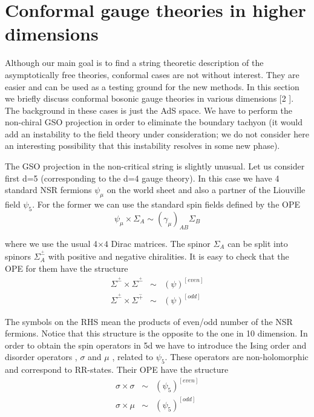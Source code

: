 \documentclass[a4paper,12pt]{article}
\begin{document}
\section{Conformal gauge theories in higher dimensions}

Although our main goal is to find a string theoretic description of the
asymptotically free theories, conformal cases are not without interest. They
are easier and can be used as a testing ground for the new methods. In this
section we briefly discuss conformal bosonic gauge theories in various
dimensions [2 ]. The background in these cases is just the AdS space. We
have to perform the non-chiral GSO projection in order to eliminate the
boundary tachyon (it would add an instability to the field theory under
consideration; we do not consider here an interesting possibility that this
instability resolves in some new phase).

The GSO projection in the non-critical string is slightly unusual. Let us
consider first d=5 (corresponding to the d=4 gauge theory). In this case we
have 4 standard NSR fermions $\psi _{\mu }$ on the world sheet and also a
partner of the Liouville field $\psi _{5}$. For the former we can use the
standard spin fields defined by the OPE 
\begin{equation}
\psi _{\mu }\times \Sigma _{A}\sim \left( \gamma _{\mu }\right) _{AB}\Sigma
_{B}
\end{equation}

where we use the usual 4$\times 4$ Dirac matrices. The spinor $\Sigma _{A}$
can be split into spinors $\Sigma _{A}^{\overset{+}{-}}$ with positive and
negative chiralities. It is easy to check that the OPE for them have the
structure 
\begin{eqnarray}
\Sigma ^{\overset{+}{-}}\times \Sigma ^{\overset{+}{-}} &\sim &(\psi
)^{[even]} \\
\Sigma ^{\overset{+}{-}}\times \Sigma ^{\overset{-}{+}} &\sim &(\psi
)^{[odd]}
\end{eqnarray}

The symbols on the RHS mean the products of even/odd number of the NSR
fermions. Notice that this structure is the opposite to the one in 10
dimension. In order to obtain the spin operators in 5d we have to introduce
the Ising order and disorder operators , $\sigma $ and $\mu $ , related to $%
\psi _{5}$. These operators are non-holomorphic and correspond to RR-states.
Their OPE have the structure 
\begin{eqnarray}
\sigma \times \sigma &\sim &(\psi _{5})^{[even]} \\
\sigma \times \mu &\sim &(\psi _{5})^{[odd]}
\end{eqnarray}
\end{document}
